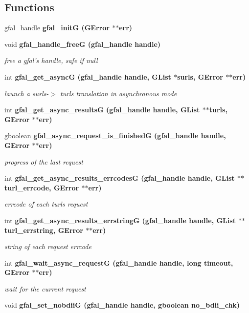 \subsection*{Functions}
\begin{CompactItemize}
\item 
gfal\_\-handle \bf{gfal\_\-init\-G} (GError $\ast$$\ast$err)
\item 
void \bf{gfal\_\-handle\_\-free\-G} (gfal\_\-handle handle)\label{gfal__common__srm_8h_9dbd943eaed291897d852fc3ae560058}

\begin{CompactList}\small\item\em free a gfal's handle, safe if null \item\end{CompactList}\item 
int \bf{gfal\_\-get\_\-async\-G} (gfal\_\-handle handle, GList $\ast$surls, GError $\ast$$\ast$err)
\begin{CompactList}\small\item\em launch a surls-$>$ turls translation in asynchronous mode \item\end{CompactList}\item 
int \bf{gfal\_\-get\_\-async\_\-results\-G} (gfal\_\-handle handle, GList $\ast$$\ast$turls, GError $\ast$$\ast$err)
\item 
gboolean \bf{gfal\_\-async\_\-request\_\-is\_\-finished\-G} (gfal\_\-handle handle, GError $\ast$$\ast$err)
\begin{CompactList}\small\item\em progress of the last request \item\end{CompactList}\item 
int \bf{gfal\_\-get\_\-async\_\-results\_\-errcodes\-G} (gfal\_\-handle handle, GList $\ast$$\ast$turl\_\-errcode, GError $\ast$$\ast$err)
\begin{CompactList}\small\item\em errcode of each turls request \item\end{CompactList}\item 
int \bf{gfal\_\-get\_\-async\_\-results\_\-errstring\-G} (gfal\_\-handle handle, GList $\ast$$\ast$turl\_\-errstring, GError $\ast$$\ast$err)
\begin{CompactList}\small\item\em string of each request errcode \item\end{CompactList}\item 
int \bf{gfal\_\-wait\_\-async\_\-request\-G} (gfal\_\-handle handle, long timeout, GError $\ast$$\ast$err)
\begin{CompactList}\small\item\em wait for the current request \item\end{CompactList}\item 
void \bf{gfal\_\-set\_\-nobdii\-G} (gfal\_\-handle handle, gboolean no\_\-bdii\_\-chk)
\end{CompactItemize}


